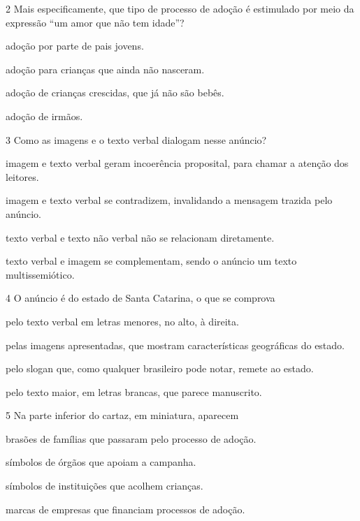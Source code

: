 \pagebreak
\num{2} Mais especificamente, que tipo de processo de adoção é estimulado por
meio da expressão ``um amor que não tem idade''?

\begin{escolha}
\item
  adoção por parte de pais jovens.
\item
  adoção para crianças que ainda não nasceram.
\item
  adoção de crianças crescidas, que já não são bebês.
\item
  adoção de irmãos.
\end{escolha}


\num{3} Como as imagens e o texto verbal dialogam nesse anúncio?

\begin{escolha}
\item
  imagem e texto verbal geram incoerência proposital, para chamar a
  atenção dos leitores.
\item
  imagem e texto verbal se contradizem, invalidando a mensagem trazida
  pelo anúncio.
\item
  texto verbal e texto não verbal não se relacionam diretamente.
\item
  texto verbal e imagem se complementam, sendo o anúncio um texto
  multissemiótico.
\end{escolha}


\num{4} O anúncio é do estado de Santa Catarina, o que se comprova

\begin{escolha}
\item
  pelo texto verbal em letras menores, no alto, à direita.
\item
  pelas imagens apresentadas, que mostram características geográficas do
  estado.
\item
  pelo slogan que, como qualquer brasileiro pode notar, remete ao
  estado.
\item
  pelo texto maior, em letras brancas, que parece manuscrito.
\end{escolha}

\num{5} Na parte inferior do cartaz, em miniatura, aparecem

\begin{escolha}
\item
  brasões de famílias que passaram pelo processo de adoção.
\item
  símbolos de órgãos que apoiam a campanha.
\item
  símbolos de instituições que acolhem crianças.
\item
  marcas de empresas que financiam processos de adoção.
\end{escolha}

